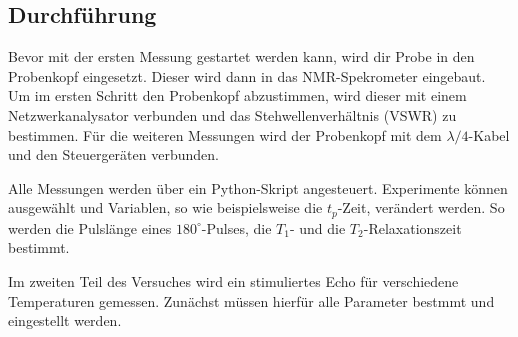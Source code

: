 \subsection{Durchf\"{u}hrung}
Bevor mit der ersten Messung gestartet werden kann, wird dir Probe in den Probenkopf eingesetzt.
Dieser wird dann in das NMR-Spekrometer eingebaut.
Um im ersten Schritt den Probenkopf abzustimmen, wird dieser mit einem Netzwerkanalysator verbunden und das Stehwellenverh\"{a}ltnis (VSWR) zu bestimmen.
F\"{u}r die weiteren Messungen wird der Probenkopf mit dem $\lambda / 4$-Kabel und den Steuerger\"{a}ten verbunden.

Alle Messungen werden \"{u}ber ein Python-Skript angesteuert.
Experimente k\"{o}nnen ausgew\"{a}hlt und Variablen, so wie beispielsweise die $t_p$-Zeit, ver\"{a}ndert werden.
So werden die Pulsl\"{a}nge eines $180^{\circ}$-Pulses, die $T_1$- und die $T_2$-Relaxationszeit bestimmt.

Im zweiten Teil des Versuches wird ein stimuliertes Echo f\"{u}r verschiedene Temperaturen gemessen.
Zun\"{a}chst m\"{u}ssen hierf\"{u}r alle Parameter bestmmt und eingestellt werden.
